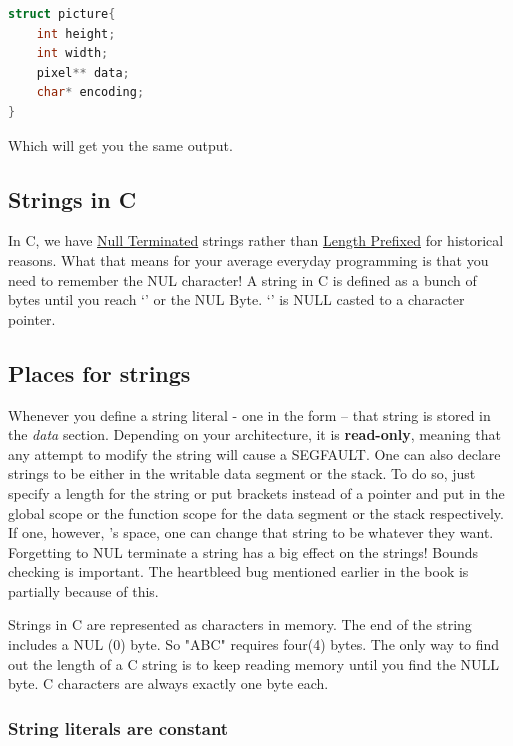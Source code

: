 \begin{lstlisting}[language=C]
struct picture{
    int height;
    int width;
    pixel** data;
    char* encoding;
}
\end{lstlisting}

Which will get you the same output.

\subsection{Strings in C}

In C, we have
\href{https://en.wikipedia.org/wiki/Null-terminated_string}{Null
	Terminated} strings rather than
\href{https://en.wikipedia.org/wiki/String_(computer_science)\#Length-prefixed}{Length
	Prefixed} for historical reasons. What that means for your average everyday programming is that you need to remember the NUL character!
A string in C is defined as a bunch of bytes until you reach `\0' or the NUL Byte. `\0' is NULL casted to a character pointer.

\subsection{Places for strings}

Whenever you define a string literal - one in the form  -- that string is stored in the \emph{data} section. Depending on your architecture, it is \textbf{read-only}, meaning that any attempt to modify the string will cause a SEGFAULT.
One can also declare strings to be either in the writable data segment or the stack. To do so, just specify a length for the string or put brackets instead of a pointer  and put in the global scope or the function scope for the data segment or the stack respectively.
If one, however, 's space, one can change that string to be whatever they want.
Forgetting to NUL terminate a string has a big effect on the strings! Bounds checking is important.
The heartbleed bug mentioned earlier in the book is partially because of this.

Strings in C are represented as characters in memory.
The end of the string includes a NUL (0) byte.
So "ABC" requires four(4) bytes.
The only way to find out the length of a C string is to keep reading memory until you find the NULL byte.
C characters are always exactly one byte each.

\subsubsection{String literals are constant}

